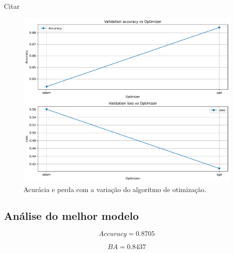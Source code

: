 Citar \cite{wilson2018marginal}

\begin{figure}[H]
\centering
\includegraphics[width=0.75\linewidth]{../../plot/mlp/search_optimizer}
\caption{Acurácia e perda com a variação do algoritmo de otimização.}
\label{fig:search_optimizer}
\end{figure}

\subsection{Análise do melhor modelo}

\begin{equation}\label{eq:acc_MLP}
	Accuracy = 0.8705
\end{equation}

\begin{equation}\label{eq:ba_MLP}
	BA = 0.8437
\end{equation}



